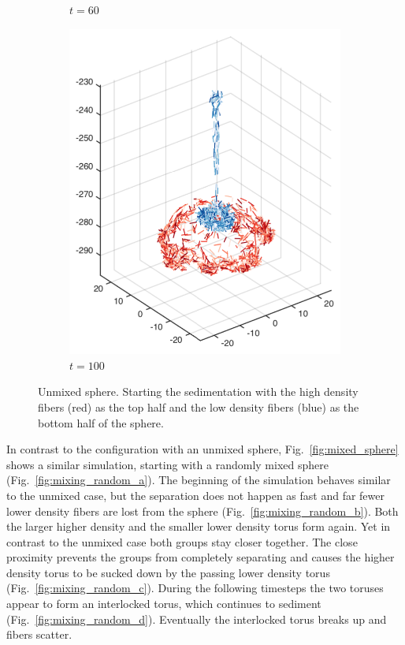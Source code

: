 \begin{figure}[!htbp]
\begin{subfigure}[h]{0.24\textwidth}
    \caption{$t=60$}\label{fig:mixing_top_c}
  \end{subfigure}
  \begin{subfigure}[h]{0.24\textwidth}
    \centering
    \includegraphics[width=\textwidth]{img/mixing/top_00100.pdf}
    \caption{$t=100$}\label{fig:mixing_top_d}
  \end{subfigure}
  \caption[Unmixed sphere]{Unmixed sphere. Starting the sedimentation with the high density fibers (red) as the top half and the low density fibers (blue) as the bottom half of the sphere.}
  \label{fig:unmixed_sphere}
\end{figure}

In contrast to the configuration with an unmixed sphere, Fig.~\ref{fig:mixed_sphere} shows a similar simulation, starting with a randomly mixed sphere (Fig.~\ref{fig:mixing_random_a}). The beginning of the simulation behaves similar to the unmixed case, but the separation does not happen as fast and far fewer lower density fibers are lost from the sphere (Fig.~\ref{fig:mixing_random_b}). Both the larger higher density and the smaller lower density torus form again. Yet in contrast to the unmixed case both groups stay closer together. The close proximity prevents the groups from completely separating and causes the higher density torus to be sucked down by the passing lower density torus (Fig.~\ref{fig:mixing_random_c}). During the following timesteps the two toruses appear to form an interlocked torus, which continues to sediment  (Fig.~\ref{fig:mixing_random_d}). Eventually the interlocked torus breaks up and fibers scatter. 

